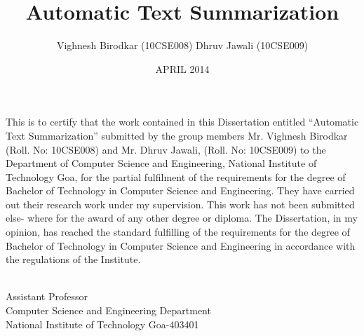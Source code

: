 \documentclass[BTech]{nitgoathesis}
\begin{document}

\title{Automatic Text Summarization}


\author{  Vighnesh Birodkar  (10CSE008) \vskip 1mm
 Dhruv Jawali  (10CSE009)}

\date{APRIL 2014}

\maketitle

\certificate

\vspace*{0.5in}

\noindent This is to certify that the work contained in this Dissertation entitled ``Automatic Text Summarization'' 
submitted by the group members Mr. Vighnesh Birodkar (Roll. No: 10CSE008)  and Mr. Dhruv Jawali, (Roll. No: 10CSE009) to the 
Department of Computer Science and Engineering, National Institute of Technology Goa, for the partial fulfilment of the requirements for 
the degree of Bachelor of Technology in Computer Science and Engineering. They have carried out their research work under my 
supervision. This work has not been submitted else- where for the award of any other degree or diploma.\newline
\noindent The Dissertation, in my opinion, has reached the standard fulfilling of the requirements for the degree of Bachelor of 
Technology in Computer Science and Engineering in accordance with the regulations of the Institute.

\vspace*{1.5in}

\begin{singlespacing}
\hspace*{2.8in}
\parbox{3in}{
 \\
\noindent Assistant Professor \\ 
\noindent Computer Science and Engineering Department \\
\noindent National Institute of Technology Goa-403401\\
\noindent  \\
} 
\end{singlespacing}
\end{document}
